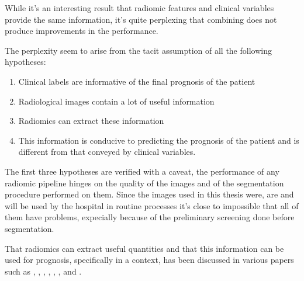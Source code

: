 
While it's an interesting result that radiomic features and clinical variables provide the same information, it's quite perplexing that combining does not produce improvements in the performance.

The perplexity seem to arise from the tacit assumption of all the following hypotheses:

\begin{enumerate}
\item Clinical labels are informative of the final prognosis of the patient
\item Radiological images contain a lot of useful information
\item Radiomics can extract these information
\item This information is conducive to predicting the prognosis of the patient and is different from that conveyed by clinical variables.
\end{enumerate}

The first three hypotheses are verified with a caveat, the performance of any radiomic pipeline hinges on the quality of the images and of the segmentation procedure performed on them. Since the images used in this thesis were, are and will be used by the hospital in routine processes it's close to impossible that all of them have problems, expecially because of the preliminary screening done before segmentation.

That radiomics can extract useful quantities and that this information can be used for prognosis, specifically in a \covid context, has been discussed in various papers such as \cite{radscore}, \cite{discrimInfluenza}, \cite{Severity}, \cite{MLcovid}, \cite{MLprognostic}, \cite{severityassessment}, \cite{covidscreening} and \cite{accuratediagnosis}.

